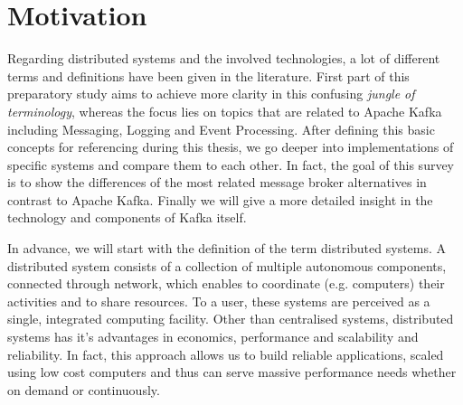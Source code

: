 \chapter{Motivation}
Regarding distributed systems and the involved technologies, a lot of different
terms and definitions have been given in the literature. First part of this
preparatory study aims to achieve more clarity in this confusing \textit{jungle of
terminology}, whereas the focus lies on topics that are related to Apache
Kafka including Messaging, Logging and Event Processing. After defining this
basic concepts for referencing during this thesis, we go deeper into
implementations of specific systems and compare them to each other. In fact, the
goal of this survey is to show the differences of the most related message
broker alternatives in contrast to Apache Kafka. Finally we will give a more
detailed insight in the technology and components of Kafka itself.\\



In advance, we will start with the definition of the term distributed systems. A
distributed system consists of a collection of multiple autonomous components,
connected through network, which enables to coordinate  (e.g. computers) their
activities and to share resources. To a user, these systems are perceived as a
single, integrated computing facility. Other than centralised systems,
distributed systems has it's advantages in economics, performance and
scalability and reliability. In fact, this approach allows us to build reliable
applications, scaled using low cost computers and thus can serve massive
performance needs whether on demand or continuously.\cite{POSA1}\cite{TAN06}
